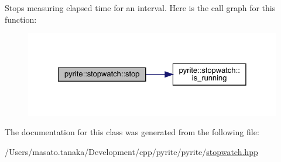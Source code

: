 Stops measuring elapsed time for an interval. Here is the call graph for this function\+:
\nopagebreak
\begin{figure}[H]
\begin{center}
\leavevmode
\includegraphics[width=328pt]{d6/dd1/classpyrite_1_1stopwatch_acfacb195247f465f29cedaa9e8686e82_cgraph}
\end{center}
\end{figure}


The documentation for this class was generated from the following file\+:\begin{DoxyCompactItemize}
\item 
/\+Users/masato.\+tanaka/\+Development/cpp/pyrite/pyrite/\mbox{\hyperlink{stopwatch_8hpp}{stopwatch.\+hpp}}\end{DoxyCompactItemize}

